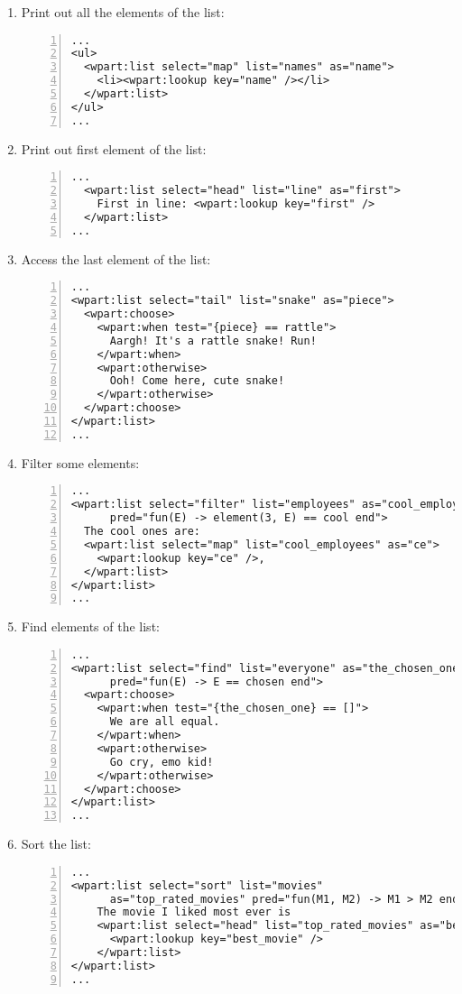 \begin{enumerate}
\item Print out all the elements of the list:
\begin{Verbatim}[numbers=left, frame=single, label=map.erl]
...
<ul>
  <wpart:list select="map" list="names" as="name">
    <li><wpart:lookup key="name" /></li>
  </wpart:list>
</ul>
...
\end{Verbatim}
\item Print out first element of the list:
\begin{Verbatim}[numbers=left, frame=single, label=head.erl]
...
  <wpart:list select="head" list="line" as="first">
    First in line: <wpart:lookup key="first" />
  </wpart:list>
...
\end{Verbatim}
\item Access the last element of the list:
\begin{Verbatim}[numbers=left, frame=single, label=tail.erl]
...
<wpart:list select="tail" list="snake" as="piece">
  <wpart:choose>
    <wpart:when test="{piece} == rattle">
      Aargh! It's a rattle snake! Run!
    </wpart:when>
    <wpart:otherwise>
      Ooh! Come here, cute snake!
    </wpart:otherwise>
  </wpart:choose>
</wpart:list>
...
\end{Verbatim}
\item Filter some elements:
\begin{Verbatim}[numbers=left, frame=single, label=filter.erl]
...
<wpart:list select="filter" list="employees" as="cool_employees" 
      pred="fun(E) -> element(3, E) == cool end">
  The cool ones are: 
  <wpart:list select="map" list="cool_employees" as="ce">
    <wpart:lookup key="ce" />, 
  </wpart:list>
</wpart:list>
...
\end{Verbatim}
\item Find elements of the list:
\begin{Verbatim}[numbers=left, frame=single, label=find.erl]
...
<wpart:list select="find" list="everyone" as="the_chosen_one" 
      pred="fun(E) -> E == chosen end">
  <wpart:choose>
    <wpart:when test="{the_chosen_one} == []">
      We are all equal.
    </wpart:when>
    <wpart:otherwise>
      Go cry, emo kid!
    </wpart:otherwise>
  </wpart:choose>
</wpart:list>
...
\end{Verbatim}
\item Sort the list:
\begin{Verbatim}[numbers=left, frame=single, label=find.erl]
...
<wpart:list select="sort" list="movies" 
      as="top_rated_movies" pred="fun(M1, M2) -> M1 > M2 end.">
    The movie I liked most ever is 
    <wpart:list select="head" list="top_rated_movies" as="best_movie">
      <wpart:lookup key="best_movie" />
    </wpart:list>
</wpart:list>
...
\end{Verbatim}
\end{enumerate}

